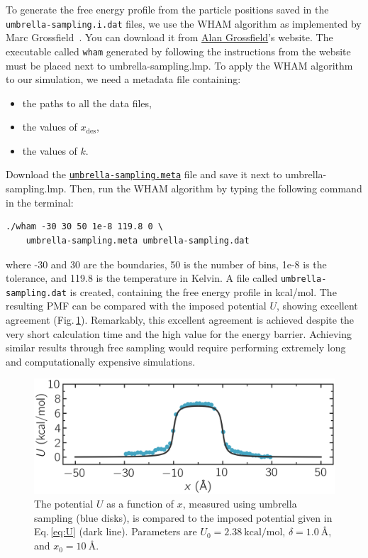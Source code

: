 \documentclass[9pt,tutorial]{livecoms}
\newcommand{\lmpcmd}[1]{\hspace{0pt}\colorbox{listing}{\textcolor{command}{\small{#1}}}\hspace{0pt}} %
\newcommand{\flecmd}[1]{\textcolor{command}{\texttt{#1}}} %
\newcommand{\dwlcmd}[1]{\textcolor{download}{\texttt{#1}}} %
\newcommand{\filepath}{https://raw.githubusercontent.com/lammpstutorials/lammpstutorials-article/main/files/}
\begin{document}
To generate the free energy profile from the particle positions
saved in the \flecmd{umbrella-sampling.i.dat} files,
we use the WHAM algorithm as implemented by Marc Grossfield~\cite{grossfieldimplementation}.
You can download it from \href{http://membrane.urmc.rochester.edu/?page_id=126}{Alan Grossfield}'s
website.  The executable called \flecmd{wham} generated by following the instructions
from the website must be placed next to \lmpcmd{umbrella-sampling.lmp}.  To apply
the WHAM algorithm to our simulation, we need a metadata file containing:
\begin{itemize}
\item the paths to all the data files,
\item the values of $x_\text{des}$,
\item the values of $k$.
\end{itemize}
Download the \href{\filepath tutorial7/umbrella-sampling.meta}{\dwlcmd{umbrella-sampling.meta}} file
and save it next to \lmpcmd{umbrella-sampling.lmp}.  Then, run the WHAM algorithm
by typing the following command in the terminal:
\begin{lstlisting}
./wham -30 30 50 1e-8 119.8 0 \
    umbrella-sampling.meta umbrella-sampling.dat
\end{lstlisting}
where -30 and 30 are the boundaries, 50 is the number of bins, 1e-8 is the tolerance,
and 119.8 is the temperature in Kelvin.  A file called \flecmd{umbrella-sampling.dat} is created,
containing the free energy profile in kcal/mol.  The resulting PMF can be compared
with the imposed potential $U$, showing excellent agreement
(Fig.\,\ref{fig:US-freenergy}).  Remarkably, this excellent agreement is achieved despite
the very short calculation time and the high value for the energy barrier.
Achieving similar results through free sampling would require performing extremely
long and computationally expensive simulations.

\begin{figure}
\centering
\includegraphics[width=\linewidth]{US-free-energy}
\caption{The potential $U$ as a function of $x$, measured using umbrella sampling
(blue disks), is compared to the imposed potential given in Eq.\,\eqref{eq:U}
(dark line). Parameters are $U_0 = 2.38~\text{kcal/mol}$, $\delta = 1.0~\text{\AA{}}$,
and $x_0 = 10~\text{\AA{}}$.}
\label{fig:US-freenergy}
\end{figure}
\end{document}
